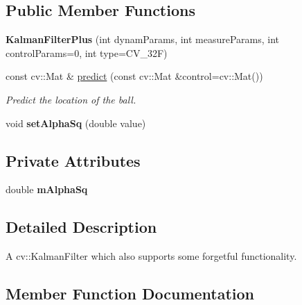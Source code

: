 \subsection*{Public Member Functions}
\begin{DoxyCompactItemize}
\item 
{\bfseries Kalman\+Filter\+Plus} (int dynam\+Params, int measure\+Params, int control\+Params=0, int type=C\+V\+\_\+32F)\hypertarget{classKalmanFilterPlus_a943c6344c382749e66c36980dee85418}{}\label{classKalmanFilterPlus_a943c6344c382749e66c36980dee85418}

\item 
const cv\+::\+Mat \& \hyperlink{classKalmanFilterPlus_afa8ba977b56b84b7f7d5b026984d3d8d}{predict} (const cv\+::\+Mat \&control=cv\+::\+Mat())
\begin{DoxyCompactList}\small\item\em Predict the location of the ball. \end{DoxyCompactList}\item 
void {\bfseries set\+Alpha\+Sq} (double value)\hypertarget{classKalmanFilterPlus_a9eb481f82573dc5b26f1c41bf090cfc0}{}\label{classKalmanFilterPlus_a9eb481f82573dc5b26f1c41bf090cfc0}

\end{DoxyCompactItemize}
\subsection*{Private Attributes}
\begin{DoxyCompactItemize}
\item 
double {\bfseries m\+Alpha\+Sq}\hypertarget{classKalmanFilterPlus_a24eb52d124afc40a13e04f751f060b17}{}\label{classKalmanFilterPlus_a24eb52d124afc40a13e04f751f060b17}

\end{DoxyCompactItemize}


\subsection{Detailed Description}
A cv\+::\+Kalman\+Filter which also supports some \textquotesingle{}forgetful\textquotesingle{} functionality. 

\subsection{Member Function Documentation}
